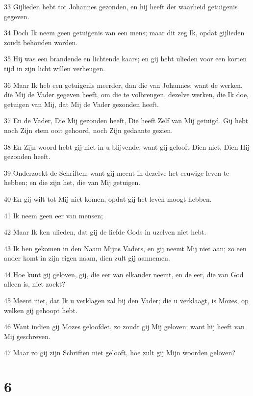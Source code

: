\par 33 Gijlieden hebt tot Johannes gezonden, en hij heeft der waarheid getuigenis gegeven.
\par 34 Doch Ik neem geen getuigenis van een mens; maar dit zeg Ik, opdat gijlieden zoudt behouden worden.
\par 35 Hij was een brandende en lichtende kaars; en gij hebt ulieden voor een korten tijd in zijn licht willen verheugen.
\par 36 Maar Ik heb een getuigenis meerder, dan die van Johannes; want de werken, die Mij de Vader gegeven heeft, om die te volbrengen, dezelve werken, die Ik doe, getuigen van Mij, dat Mij de Vader gezonden heeft.
\par 37 En de Vader, Die Mij gezonden heeft, Die heeft Zelf van Mij getuigd. Gij hebt noch Zijn stem ooit gehoord, noch Zijn gedaante gezien.
\par 38 En Zijn woord hebt gij niet in u blijvende; want gij gelooft Dien niet, Dien Hij gezonden heeft.
\par 39 Onderzoekt de Schriften; want gij meent in dezelve het eeuwige leven te hebben; en die zijn het, die van Mij getuigen.
\par 40 En gij wilt tot Mij niet komen, opdat gij het leven moogt hebben.
\par 41 Ik neem geen eer van mensen;
\par 42 Maar Ik ken ulieden, dat gij de liefde Gods in uzelven niet hebt.
\par 43 Ik ben gekomen in den Naam Mijns Vaders, en gij neemt Mij niet aan; zo een ander komt in zijn eigen naam, dien zult gij aannemen.
\par 44 Hoe kunt gij geloven, gij, die eer van elkander neemt, en de eer, die van God alleen is, niet zoekt?
\par 45 Meent niet, dat Ik u verklagen zal bij den Vader; die u verklaagt, is Mozes, op welken gij gehoopt hebt.
\par 46 Want indien gij Mozes geloofdet, zo zoudt gij Mij geloven; want hij heeft van Mij geschreven.
\par 47 Maar zo gij zijn Schriften niet gelooft, hoe zult gij Mijn woorden geloven?

\chapter{6}

